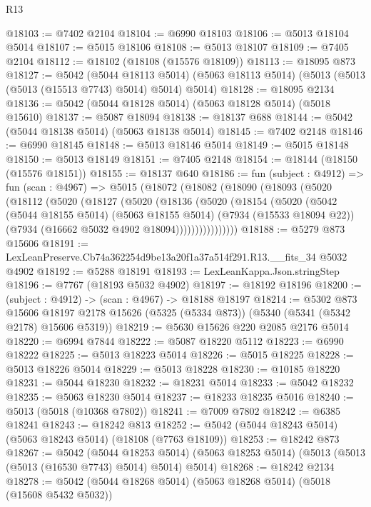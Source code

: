 \begin{lexlean}{R13}
\begin{coremodule}
@18103 := @7402 @2104
@18104 := @6990 @18103
@18106 := @5013 @18104 @5014
@18107 := @5015 @18106
@18108 := @5013 @18107
@18109 := @7405 @2104
@18112 := @18102 (@18108 (@15576 @18109))
@18113 := @18095 @873
@18127 := @5042
    (@5044 @18113 @5014)
    (@5063 @18113 @5014)
    (@5013 (@5013 (@5013 (@15513 @7743) @5014) @5014) @5014)
@18128 := @18095 @2134
@18136 := @5042 (@5044 @18128 @5014) (@5063 @18128 @5014) (@5018 @15610)
@18137 := @5087 @18094
@18138 := @18137 @688
@18144 := @5042 (@5044 @18138 @5014) (@5063 @18138 @5014)
@18145 := @7402 @2148
@18146 := @6990 @18145
@18148 := @5013 @18146 @5014
@18149 := @5015 @18148
@18150 := @5013 @18149
@18151 := @7405 @2148
@18154 := @18144 (@18150 (@15576 @18151))
@18155 := @18137 @640
@18186 := fun (subject : @4912) =>
  fun (scan : @4967) =>
  @5015
    (@18072
      (@18082
        (@18090
          (@18093
            (@5020
              (@18112
                (@5020
                  (@18127
                    (@5020
                      (@18136
                        (@5020
                          (@18154
                            (@5020
                              (@5042
                                (@5044 @18155 @5014)
                                (@5063 @18155 @5014)
                                (@7934 (@15533 @18094 @22))
                                (@7934 (@16662 @5032 @4902 @18094))))))))))))))))
@18188 := @5279 @873 @15606
@18191 := LexLeanPreserve.Cb74a362254d9be13a20f1a37a514f291.R13.__fits_34 @5032 @4902
@18192 := @5288 @18191
@18193 := LexLeanKappa.Json.stringStep
@18196 := @7767 (@18193 @5032 @4902)
@18197 := @18192 @18196
@18200 := (subject : @4912) -> (scan : @4967) -> @18188 @18197
@18214 := @5302
    @873
    @15606
    @18197
    @2178
    @15626
    (@5325 (@5334 @873))
    (@5340 (@5341 (@5342 @2178) @15606 @5319))
@18219 := @5630 @15626 @220 @2085 @2176 @5014
@18220 := @6994 @7844
@18222 := @5087 @18220 @5112
@18223 := @6990 @18222
@18225 := @5013 @18223 @5014
@18226 := @5015 @18225
@18228 := @5013 @18226 @5014
@18229 := @5013 @18228
@18230 := @10185 @18220
@18231 := @5044 @18230
@18232 := @18231 @5014
@18233 := @5042 @18232
@18235 := @5063 @18230 @5014
@18237 := @18233 @18235 @5016
@18240 := @5013 (@5018 (@10368 @7802))
@18241 := @7009 @7802
@18242 := @6385 @18241
@18243 := @18242 @813
@18252 := @5042 (@5044 @18243 @5014) (@5063 @18243 @5014) (@18108 (@7763 @18109))
@18253 := @18242 @873
@18267 := @5042
    (@5044 @18253 @5014)
    (@5063 @18253 @5014)
    (@5013 (@5013 (@5013 (@16530 @7743) @5014) @5014) @5014)
@18268 := @18242 @2134
@18278 := @5042 (@5044 @18268 @5014) (@5063 @18268 @5014) (@5018 (@15608 @5432 @5032))

\end{coremodule}
\end{lexlean}
